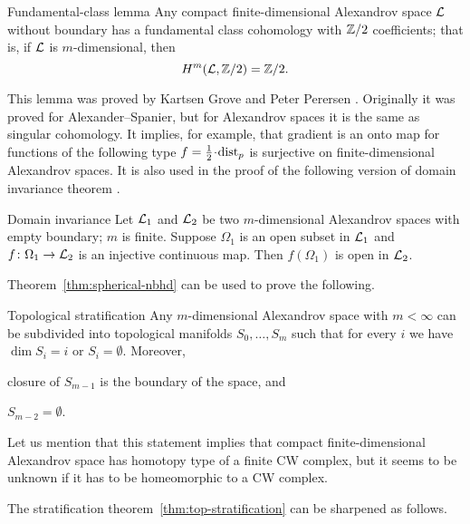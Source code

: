 \begin{thm}{Fundamental-class lemma}\label{lem:fund-class}
Any compact finite-dimensional Alexandrov space $\mathcal{L}$ without boundary has a fundamental class cohomology with $\mathbb{Z}/2$ coefficients;
that is, if $\mathcal{L}$ is $m$-dimensional, then
\[H^m(\mathcal{L},\mathbb{Z}/2)=\mathbb{Z}/2.\]

\end{thm}

This lemma was proved by Kartsen Grove and Peter Perersen \cite{grove-petersen}.
Originally it was proved for Alexander--Spanier, but for Alexandrov spaces it is the same as singular cohomology.
It implies, for example, that gradient is an onto map  for functions of the following type $f=\tfrac12\cdot\distfun_p$ is surjective on finite-dimensional Alexandrov spaces.
It is also used in the proof of the following version of domain invariance theorem \cite[Theorem 3.2]{kapovitch-zhu}.

\begin{thm}{Domain invariance}\label{thm-inv-domain}
Let $\mathcal{L}_1$ and $\mathcal{L}_2$ be two $m$-dimensional Alexandrov spaces with empty boundary; $m$ is finite.
Suppose $\Omega_1$ is an open subset in $\mathcal{L}_1$ and $f\colon\Omega_1\to \mathcal{L}_2$ is an injective continuous map.
Then $f(\Omega_1)$ is open in $\mathcal{L}_2$.
\end{thm}

Theorem~\ref{thm:spherical-nbhd} can be used to prove the following. 

\begin{thm}{Topological stratification}\label{thm:top-stratification}
Any $m$-dimensional Alexandrov space with $m<\infty$ can be subdivided into topological manifolds $S_0,\dots,S_m$ such that for every $i$ we have $\dim S_i=i$ or $S_i=\emptyset$.
Moreover,
\begin{subthm}{}
closure of $S_{m-1}$ is the boundary of the space, and
\end{subthm}

\begin{subthm}{}
$S_{m-2}=\emptyset$.
\end{subthm}

\end{thm}

Let us mention that this statement implies that compact finite-dimensional Alexandrov space has homotopy type of a finite CW complex,
but it seems to be unknown if it has to be homeomorphic to a CW complex.

The stratification theorem~\ref{thm:top-stratification} can be sharpened as follows.

